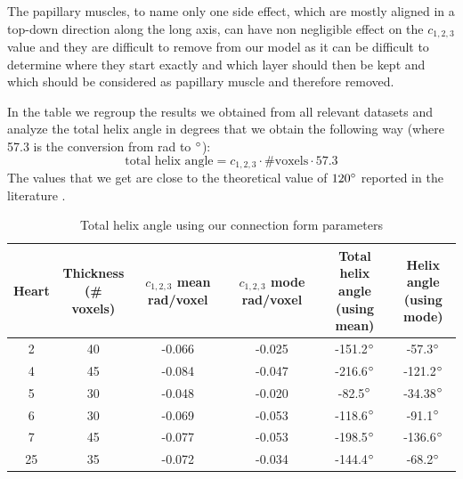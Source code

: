 The papillary muscles, to name only one side effect, which are mostly aligned in a top-down direction along the long axis, can have non negligible effect on the $c_{1,2,3}$ value and they are difficult to remove from our model as it can be difficult to determine where they start exactly and which layer should then be kept and which should be considered as papillary muscle and therefore removed.

In the table we regroup the results we obtained from all relevant datasets and analyze the total helix angle in degrees that we obtain the following way (where 57.3 is the conversion from rad to $^{\circ}$):
\begin{equation}
    \text{total helix angle} = c_{1,2,3}\cdot \text{\#voxels}\cdot 57.3
\end{equation}
The values that we get are close to the theoretical value of $120^{\circ}$ reported in the literature \cite{piuzephd}.

\begin{table}
    \centering
    \begin{tabular}{|c | c | c | c| c| c|} 
         \hline
         Heart & \shortstack{Thickness \\ (\# voxels)} & \shortstack{$c_{1,2,3}$ mean \\ rad/voxel} & \shortstack{$c_{1,2,3}$ mode \\ rad/voxel} & \shortstack{Total helix angle \\ (using mean)} & \shortstack{Helix angle \\ (using mode)}\\
         \hline
         2 & 40 & -0.066 & -0.025 & -151.2$^{\circ}$ & -57.3$^{\circ}$ \\ 
         \hline
         4 & 45 & -0.084 & -0.047 & -216.6$^{\circ}$ & -121.2$^{\circ}$ \\
         \hline
         5 & 30 & -0.048 & -0.020 & -82.5$^{\circ}$ & -34.38$^{\circ}$ \\
         \hline
         6 & 30 & -0.069 & -0.053 & -118.6$^{\circ}$ & -91.1$^{\circ}$ \\
         \hline
         7 & 45 & -0.077 & -0.053 & -198.5$^{\circ}$ & -136.6$^{\circ}$ \\ 
         \hline
         25 & 35 & -0.072 & -0.034 & -144.4$^{\circ}$ & -68.2$^{\circ}$ \\
         \hline
    \end{tabular}
    \caption{Total helix angle using our connection form parameters}
\end{table}


